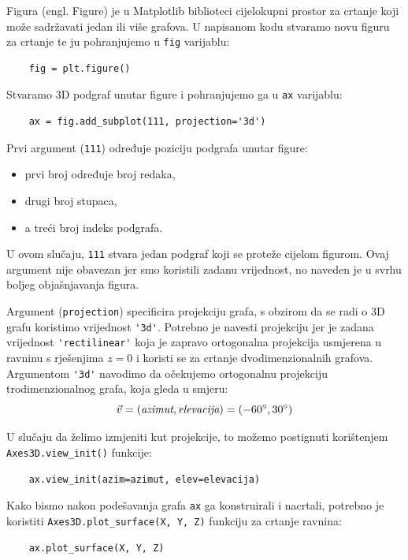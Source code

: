 Figura (engl. Figure) je u Matplotlib biblioteci cijelokupni prostor za crtanje koji može sadržavati jedan ili više grafova.
U napisanom kodu stvaramo novu figuru za crtanje te ju pohranjujemo u \verb|fig| varijablu:
\begin{verbatim}
    fig = plt.figure()
\end{verbatim}

Stvaramo 3D podgraf unutar figure i pohranjujemo ga u \verb|ax| varijablu:

\begin{verbatim}
    ax = fig.add_subplot(111, projection='3d')
\end{verbatim} 

Prvi argument (\verb|111|) određuje poziciju podgrafa unutar figure:
\begin{itemize}
    \item prvi broj određuje broj redaka,
    \item drugi broj stupaca,
    \item a treći broj indeks podgrafa.
\end{itemize}
U ovom slučaju, \verb|111| stvara jedan podgraf koji se proteže cijelom figurom. Ovaj argument nije obavezan jer smo koristili zadanu vrijednost, no naveden je u svrhu boljeg objašnjavanja figura.

Argument (\verb|projection|) specificira projekciju grafa, s obzirom da se radi o 3D grafu koristimo vrijednost \verb|'3d'|.
Potrebno je navesti projekciju jer je zadana vrijednost \verb|'rectilinear'| koja je zapravo ortogonalna projekcija usmjerena u ravninu s rješenjima $z = 0$ i koristi se za crtanje dvodimenzionalnih grafova.
Argumentom \verb|'3d'| navodimo da očekujemo ortogonalnu projekciju trodimenzionalnog grafa, koja gleda u smjeru:
$$
    \vec{v} = (\text{\it azimut}, \text{\it elevacija}) = (-60^{\circ}, 30^{\circ})
$$

U slučaju da želimo izmjeniti kut projekcije, to možemo postignuti korištenjem \verb|Axes3D.view_init()| funkcije:
\begin{verbatim}
    ax.view_init(azim=azimut, elev=elevacija)
\end{verbatim}

Kako bismo nakon podešavanja grafa \verb|ax| ga konstruirali i nacrtali, potrebno je koristiti \verb|Axes3D.plot_surface(X, Y, Z)| funkciju za crtanje ravnina:
\begin{verbatim}
    ax.plot_surface(X, Y, Z)
\end{verbatim}

